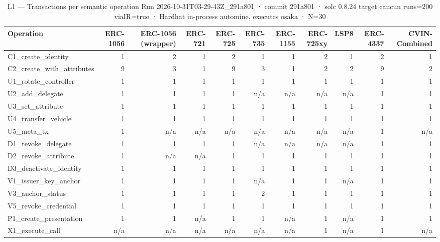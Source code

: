 \begin{table}[ht]
\centering
\small
\begin{tabular}{lrrrrrrrrrr}
\toprule
Operation & ERC-1056 & ERC-1056 (wrapper) & ERC-721 & ERC-725 & ERC-735 & ERC-1155 & ERC-725xy & LSP8 & ERC-4337 & CVIN-Combined \\
\midrule
C1\_create\_identity & 1 & 2 & 1 & 2 & 1 & 1 & 2 & 1 & 2 & 1 \\
C2\_create\_with\_attributes & 9 & 3 & 1 & 9 & 3 & 1 & 2 & 2 & 9 & 2 \\
U1\_rotate\_controller & 1 & 1 & 1 & 1 & 1 & 1 & 1 & 1 & 1 & 1 \\
U2\_add\_delegate & 1 & 1 & 1 & 1 & n/a & n/a & n/a & n/a & 1 & 1 \\
U3\_set\_attribute & 1 & 1 & 1 & 1 & 1 & 1 & 1 & 1 & 1 & 1 \\
U4\_transfer\_vehicle & 1 & 1 & 1 & 1 & 1 & 1 & 1 & 1 & 1 & 1 \\
U5\_meta\_tx & 1 & n/a & n/a & n/a & n/a & n/a & n/a & n/a & 1 & n/a \\
D1\_revoke\_delegate & 1 & 1 & 1 & 1 & n/a & n/a & n/a & n/a & 1 & 1 \\
D2\_revoke\_attribute & 1 & n/a & n/a & 1 & 1 & 1 & 1 & 1 & 1 & 1 \\
D3\_deactivate\_identity & 1 & 1 & 1 & 1 & 1 & 1 & 1 & 1 & 1 & 1 \\
V1\_issuer\_key\_anchor & 1 & 1 & 1 & 1 & n/a & 1 & 1 & n/a & 1 & 1 \\
V3\_anchor\_status & 1 & 1 & 1 & 1 & 2 & 1 & 1 & 1 & 1 & 1 \\
V5\_revoke\_credential & 1 & 1 & 1 & 1 & 1 & 1 & 1 & 1 & 1 & 1 \\
P1\_create\_presentation & 1 & 1 & n/a & 1 & 1 & n/a & 1 & n/a & 1 & 1 \\
X1\_execute\_call & n/a & n/a & n/a & n/a & n/a & n/a & 1 & n/a & 1 & n/a \\
\bottomrule
\end{tabular}
\caption{L1 — Transactions per semantic operation Run 2026-10-31T03-29-43Z\_291a801 · commit 291a801 · solc 0.8.24 target cancun runs=200 viaIR=true · Hardhat in-process automine, executes osaka · N=30}
\label{tab:crud_txcount}
\end{table}
